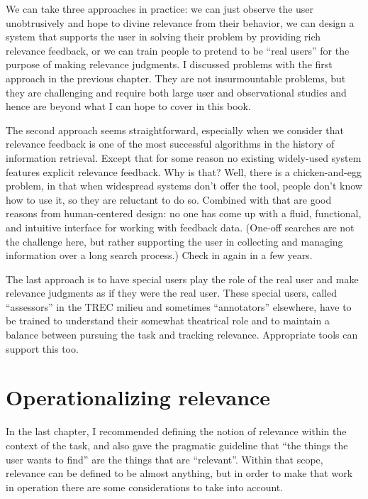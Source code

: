 \documentclass[nobib]{tufte-book}
\begin{document}
We can take three approaches in practice: we can just observe the user unobtrusively and hope to divine relevance from their behavior, we can design a system that supports the user in solving their problem by providing rich relevance feedback, or we can train people to pretend to be ``real users'' for the purpose of making relevance judgments.  I discussed problems with the first approach in the previous chapter.  They are not insurmountable problems, but they are challenging and require both large user and observational studies and hence are beyond what I can hope to cover in this book.

The second approach seems straightforward, especially when we consider that relevance feedback is one of the most successful algorithms in the history of information retrieval.  Except that for some reason no existing widely-used system features explicit relevance feedback.  Why is that?  Well, there is a chicken-and-egg problem, in that when widespread systems don't offer the tool, people don't know how to use it, so they are reluctant to do so.  Combined with that are good reasons from human-centered design: no one has come up with a fluid, functional, and intuitive interface for working with feedback data.  (One-off searches are not the challenge here, but rather supporting the user in collecting and managing information over a long search process.)  Check in again in a few years.

The last approach is to have special users play the role of the real user and make relevance judgments as if they were the real user.  These special users, called ``assessors'' in the TREC milieu and sometimes ``annotators'' elsewhere, have to be trained to understand their somewhat theatrical role and to maintain a balance between pursuing the task and tracking relevance.  Appropriate tools can support this too.

\section{Operationalizing relevance}

In the last chapter, I recommended defining the notion of relevance within the context of the task, and also gave the pragmatic guideline that ``the things the user wants to find'' are the things that are ``relevant''.  Within that scope, relevance can be defined to be almost anything, but in order to make that work in operation there are some considerations to take into account.
\end{document}
